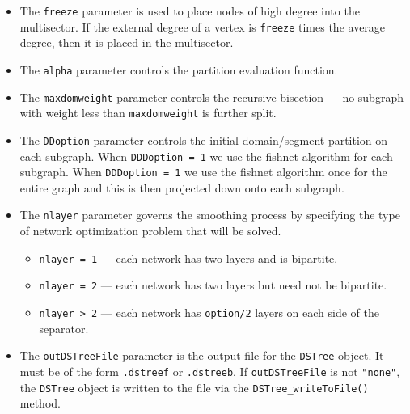 \begin{enumerate}
\begin{itemize}
\item
The {\tt freeze} parameter is used to place nodes of high degree
into the multisector.
If the external degree of a vertex is {\tt freeze} times the
average degree, then it is placed in the multisector.
\item
The {\tt alpha} parameter controls the partition evaluation function.
\item
The {\tt maxdomweight} parameter controls the recursive bisection
--- no subgraph with weight less than {\tt maxdomweight} is
further split.
\item
The {\tt DDoption} parameter controls the initial domain/segment
partition on each subgraph.
When {\tt DDDoption = 1} we use the fishnet algorithm for each
subgraph.
When {\tt DDDoption = 1} we use the fishnet algorithm once for the
entire graph and this is then projected down onto each subgraph.
\item
The {\tt nlayer} parameter governs the smoothing process by specifying 
the type of network optimization problem that will be solved.
\begin{itemize}
\item
{\tt nlayer = 1} --- each network has two layers and is bipartite.
\item
{\tt nlayer = 2} 
--- each network has two layers but need not be bipartite.
\item
{\tt nlayer > 2} --- each network has {\tt option/2} layers
on each side of the separator.
\end{itemize}
\item
The {\tt outDSTreeFile} parameter is the output file 
for the {\tt DSTree} object. 
It must be of the form {\tt *.dstreef} or {\tt *.dstreeb}.
If {\tt outDSTreeFile} is not {\tt "none"}, 
the {\tt DSTree} object is written to the file via the
{\tt DSTree\_writeToFile()} method.
\end{itemize}
\end{enumerate}
